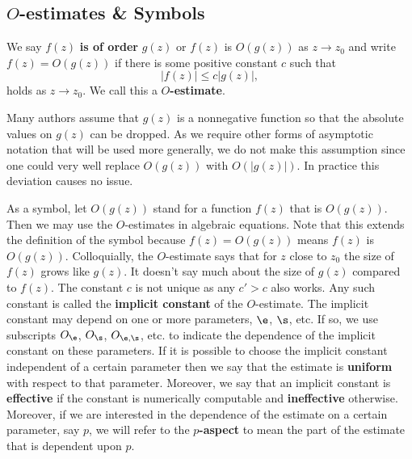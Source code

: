       \subsection*{\texorpdfstring{$O$}{O}-estimates \& Symbols}
        We say $f(z)$ \textbf{is of order} $g(z)$ or $f(z)$ is $O(g(z))$ as $z \to z_{0}$ and write $f(z) = O(g(z))$
        if there is some positive constant $c$ such that
        \[
          |f(z)| \le c|g(z)|,
        \]
        holds as $z \to z_{0}$. We call this a \textbf{$O$-estimate}.
        
        \begin{remark}
          Many authors assume that $g(z)$ is a nonnegative function so that the absolute values on $g(z)$ can be dropped. As we require other forms of asymptotic notation that will be used more generally, we do not make this assumption since one could very well replace $O(g(z))$ with $O(|g(z)|)$. In practice this deviation causes no issue.
        \end{remark}
        
        As a symbol, let $O(g(z))$ stand for a function $f(z)$ that is $O(g(z))$. Then we may use the $O$-estimates in algebraic equations. Note that this extends the definition of the symbol because $f(z) = O(g(z))$ means $f(z)$ is $O(g(z))$. Colloquially, the $O$-estimate says that for $z$ close to $z_{0}$ the size of $f(z)$ grows like $g(z)$. It doesn't say much about the size of $g(z)$ compared to $f(z)$. The constant $c$ is not unique as any $c' > c$ also works. Any such constant is called the \textbf{implicit constant} of the $O$-estimate. The implicit constant may depend on one or more parameters, $\e$, $\s$, etc. If so, we use subscripts $O_{\e}$, $O_{\s}$, $O_{\e,\s}$, etc. to indicate the dependence of the implicit constant on these parameters. If it is possible to choose the implicit constant independent of a certain parameter then we say that the estimate is \textbf{uniform} with respect to that parameter. Moreover, we say that an implicit constant is \textbf{effective} if the constant is numerically computable and \textbf{ineffective} otherwise. Moreover, if we are interested in the dependence of the estimate on a certain parameter, say $p$, we will refer to the \textbf{$p$-aspect} to mean the part of the estimate that is dependent upon $p$.

